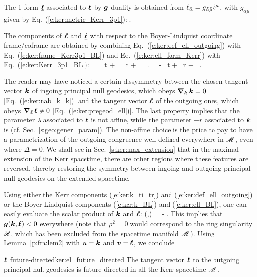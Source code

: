 The 1-form $\underline{\bm{\ell}}$ associated to $\bm{\ell}$ by
$\bm{g}$-duality is obtained
from $\ell_{\tilde{\alpha}} = g_{\tilde{\alpha}\tilde{\mu}} \ell^{\tilde{\mu}}$, with
$g_{\tilde{\alpha}\tilde{\mu}}$ given by Eq.~(\ref{e:ker:metric_Kerr_3p1}):
\be \label{e:ker:ell_form_Kerr}
     .
\ee

The components of $\bm{\ell}$ and $\underline{\bm{\ell}}$ with respect to the Boyer-Lindquist coordinate frame/coframe
are obtained by combining Eq.~(\ref{e:ker:def_ell_outgoing}) with Eq.~(\ref{e:ker:frame_Kerr3p1_BL})
and Eq.~(\ref{e:ker:ell_form_Kerr}) with Eq.~(\ref{e:ker:Kerr_3p1_BL}):
\be \label{e:ker:ell_BL}
    \wl =  \wpar_t + \, \wpar_r
    + \, \wpar_\ph .
\ee
\be \label{e:ker:ell_form_BL}
    \uu{\el} = - \, \dd t
     + \,  \dd r
     +  \, \dd \ph .
\ee


\begin{remark} \label{r:ker:k_versus_l}
The reader may have noticed a certain dissymmetry between the chosen tangent vector
$\bm{k}$ of ingoing principal null geodesics, which obeys $\bm{\nabla}_{\bm{k}}\, \bm{k} = 0$
[Eq.~(\ref{e:ker:nab_k_k})] and the tangent vector $\bm{\ell}$ of the outgoing
ones, which obeys $\bm{\nabla}_{\bm{\ell}}\, \bm{\ell} \not= 0$ [Eq.~(\ref{e:ker:pregeod_ell})].
The last property implies that the
parameter $\lambda$ associated to $\bm{\ell}$ is not affine, while the
parameter $-r$ associated to $\bm{k}$ is (cf. Sec.~\ref{s:geo:gener_param}).
The non-affine choice is the price to pay to have a parametrization of the outgoing
congruence well-defined everywhere in $\mathscr{M}$, even where $\Delta=0$. We shall see in
Sec.~\ref{s:ker:max_extension} that in the maximal extension of the Kerr spacetime, there are other regions where these features are reversed,
thereby restoring the symmetry between ingoing and outgoing principal null geodesics
on the extended spacetime.
\end{remark}


Using either the Kerr components (\ref{e:ker:k_ti_tr}) and
(\ref{e:ker:def_ell_outgoing})
or the Boyer-Lindquist components (\ref{e:ker:k_BL}) and (\ref{e:ker:ell_BL}),
one can easily evaluate the scalar product of $\bm{k}$ and $\bm{\ell}$:
\be \label{e:ker:k_scal_ell}
    (,\wl) = -  .
\ee
This implies that $\bm{g}(\bm{k},\bm{\ell}) < 0$ everywhere (note that $\rho^2= 0$
would correspond to the ring singularity $\mathscr{R}$, which has been excluded from
the spacetime manifold $\mathscr{M}$).
Using Lemma~\ref{p:fra:lem2} with $\bm{u}=\bm{k}$ and
$\bm{v} = \bm{\ell}$, we conclude
\begin{tprop}{$\bm{\ell}$ future-directed}{ker:el_future_directed}
The tangent vector $\bm{\ell}$ to the outgoing principal null geodesics
is future-directed in all the Kerr spacetime $\mathscr{M}$.
\end{tprop}

